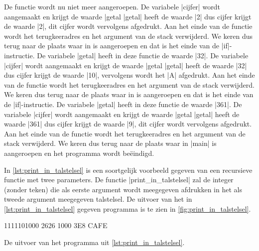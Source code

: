 De functie \printInElftalligStelsel{} wordt nu niet meer aangeroepen.
De variabele |cijfer| wordt aangemaakt en krijgt de waarde |getal %
|getal| heeft de waarde |2| dus cijfer krijgt de waarde |2|, dit cijfer wordt vervolgens afgedrukt.
Aan het einde van de functie \printInElftalligStelsel{} wordt het terugkeeradres en het argument van de stack verwijderd.
We keren dus terug naar de plaats waar \printInElftalligStelsel{} in \printInElftalligStelsel{} is aangeroepen en dat is het einde van de |if|-instructie.
De variabele |getal| heeft in deze functie de waarde |32|.
De variabele |cijfer| wordt aangemaakt en krijgt de waarde |getal %
|getal| heeft de waarde |32| dus cijfer krijgt de waarde |10|, vervolgens wordt het  |A| afgedrukt.
Aan het einde van de functie  wordt het terugkeeradres en het argument van de stack verwijderd.
We keren dus terug naar de plaats waar \printInElftalligStelsel{} in \printInElftalligStelsel{} is aangeroepen en dat is het einde van de |if|-instructie.
De variabele |getal| heeft in deze functie de waarde |361|.
De variabele |cijfer| wordt aangemaakt en krijgt de waarde |getal %
|getal| heeft de waarde |361| dus cijfer krijgt de waarde |9|, dit cijfer wordt vervolgens afgedrukt.
Aan het einde van de functie \printInElftalligStelsel{} wordt het terugkeeradres en het argument van de stack verwijderd.
We keren dus terug naar de plaats waar \printInElftalligStelsel{} in |main| is aangeroepen en het programma wordt beëindigd.

In \cref{lst:print_in_talstelsel} is een soortgelijk voorbeeld gegeven van een recursieve functie met twee parameters.
De functie |print_in_talstelsel| zal de integer (zonder teken) die als eerste argument wordt meegegeven afdrukken in het als tweede argument meegegeven talstelsel.
De uitvoer van het in \cref{lst:print_in_talstelsel} gegeven programma is te zien in \cref{fig:print_in_talstelsel}.


\begin{myFigure}[!htbp]
	\centering%
	\begin{coutput}
1111101000
2626
1000
3E8
CAFE
	\end{coutput}
	\caption{De uitvoer van het programma uit \cref{lst:print_in_talstelsel}.}
	\label{fig:print_in_talstelsel}
\end{myFigure}

